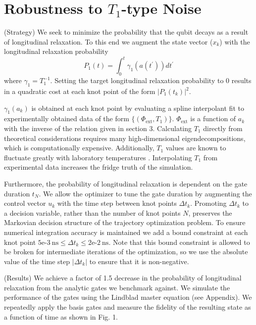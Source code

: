 \documentclass[
  amsfonts,
  amsmath,
  tbtags,
  amssymb,
  aps,
  nobibnotes,
  twocolumn,
]{revtex4-2}
\begin{document}
\section{Robustness to $T_{1}$-type Noise}
(Strategy) We seek to minimize the probability
that the qubit decays as a result of longitudinal
relaxation. To this end we augment the state vector ($x_{k}$) with the
longitudinal relaxation probability
\begin{equation}
  P_{1}(t) = \int_{0}^{t} \gamma_{1}(a(t^{\prime})) dt^{\prime}
\end{equation}
where $\gamma_{1} = T_{1}^{-1}$. Setting the target
longitudinal relaxation probability to 0 results in
a quadratic cost at each knot point
of the form ${\lvert P_{1}(t_{k}) \rvert}^{2}$.

$\gamma_{1}(a_{k})$
is obtained at each knot point by evaluating
a spline interpolant fit to
experimentally obtained data of the form
$\{(\Phi_{\textrm{ext}}, T_{1})\}$.
$\Phi_{\textrm{ext}}$ is a function of $a_{k}$
with the inverse of the relation given in section 3.
Calculating $T_{1}$ directly from theoretical
considerations requires many high-dimensional
eigendecompositions, which
is computationally expensive. Additionally,
$T_{1}$ values are known to fluctuate greatly
with laboratory temperatures \cite{klimov2018fluctuations}.
Interpolating $T_{1}$ from experimental data increases
the fridge truth of the simulation.

Furthermore, the probability of longitudinal 
relaxation is dependent on the gate duration $t_{N}$.
We allow the optimizer to tune the gate duration by
augmenting the control vector $u_{k}$ with
the time step between knot points $\Delta t_{k}$.
Promoting $\Delta t_{k}$ to a decision variable, rather
than the number of knot points $N$, preserves the
Markovian decision structure of the trajectory
optimization problem. To ensure numerical
integration accuracy is maintained we add a bound
constraint at each knot point
$5\textrm{e-}3 \ \textrm{ns} \le
\Delta t_{k} \le 2\textrm{e-}2 \ \textrm{ns}$.
Note that this bound constraint is allowed to be
broken for intermediate iterations of the optimization,
so we use the absolute value of the time step
$\lvert \Delta t_{k} \rvert$ to ensure that it is non-negative.

(Results) We achieve a factor of 1.5 decrease in the probability
of longitudinal relaxation from the analytic gates we benchmark
against. We simulate the performance of the gates using the
Lindblad master equation (see Appendix). We repeatedly apply the basis gates
and measure the fidelity of the resulting state as a function
of time as shown in Fig. 1.
\end{document}
